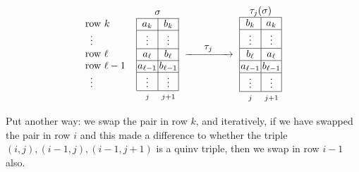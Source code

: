 \documentclass[11pt]{article}
\theoremstyle{definition}
\numberwithin{equation}{section}
\begin{document}
\begin{defn}
\begin{equation*}
\renewcommand{\arraystretch}{1}  %
\setlength{\arraycolsep}{1pt} %
\begin{array}{l|c|c|}
\multicolumn{1}{c}{}&
\multicolumn{2}{c}{\sigma}
\\
\cline{2-3} %
\text{row } k &  a_k & b_k\\
 \cline{2-3} %
\,\,\,\vdots & \vdots & \vdots \\
\cline{2-3}
\text{row } \ell & a_{\ell} & b_{\ell}\\
\cline{2-3} %
\text{row } \ell-1\,\,\,\,\,\, & a_{\ell-1} & b_{\ell-1}\\
 \cline{2-3}
\,\,\,\vdots & \vdots & \vdots \\
 \cline{2-3}
 \multicolumn{1}{c}{}&
\multicolumn{1}{c}{\scriptstyle j}&
\multicolumn{1}{c}{\scriptstyle j+1}
\end{array}
\,\,\xrightarrow{\makebox[1.5cm]{$\tau_j$}}\,\,
\begin{array}{|c|c|}
\multicolumn{2}{c}{\tau_j(\sigma)}
\\
\hline
b_k &  a_k\\
\hline
\vdots & \vdots \\
\hline
b_{\ell} & a_{\ell}\\
\hline
a_{\ell-1} & b_{\ell-1}\\
\hline
\vdots & \vdots \\
\hline
\multicolumn{1}{c}{\scriptstyle j}&
\multicolumn{1}{c}{\scriptstyle j+1}
\end{array}
\end{equation*}

Put another way: we swap the pair in row $k$, and iteratively, if we have swapped the pair in row $i$ and this made a difference to whether the triple $(i,j), (i-1, j), (i-1, j+1)$ is a quinv
triple, then we swap in row $i-1$ also. 
\end{defn}
\end{document}
